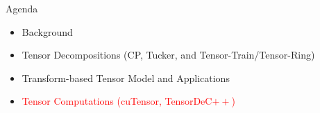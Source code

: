 \documentclass[t, 10pt, handout, aspectratio=169]{beamer}
\begin{document}
\begin{frame}{Agenda}
\begin{itemize}
    \large \item {Background}
    \large \item {Tensor Decompositions (CP, Tucker, and Tensor-Train/Tensor-Ring)}
    \large \item {Transform-based Tensor Model and Applications}
    \large \item \textcolor{red}{Tensor Computations (cuTensor, TensorDeC$++$)}
\end{itemize}
\end{frame}
\end{document}

